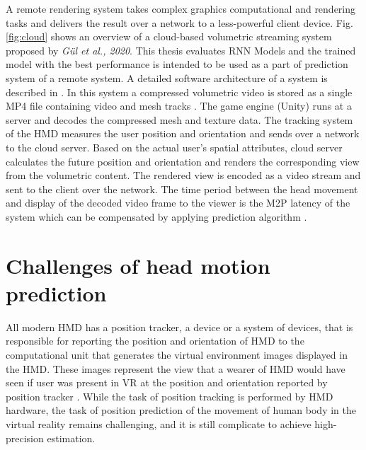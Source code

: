 A remote rendering system takes complex graphics computational and rendering tasks and delivers the result over a network to a less-powerful client device. Fig. \ref{fig:cloud}  shows an overview of a cloud-based volumetric streaming system proposed by \textit{Gül et al., 2020}. This thesis evaluates RNN Models and the trained model with the best performance is intended to be used as a part of prediction system of a remote system. A detailed software architecture of a system is described in \cite{serhan_cloud_streaming}. In this system a compressed volumetric video is stored as a single MP4 file containing video and mesh tracks \cite{serhan_kalman}. The game engine (Unity) runs at a server and decodes the compressed mesh and texture data. The tracking system of the HMD measures the user position and orientation and sends over a network to the cloud server. Based on the actual user's spatial attributes, cloud server calculates the future position and orientation and renders the corresponding view from the volumetric content. The rendered view is encoded as a video stream and sent to the client over the network. The time period between the head movement and display of the decoded video frame to the viewer is the M2P latency of the system which can be compensated by applying prediction algorithm \cite{serhan_kalman}.

\newpage
\section{Challenges of head motion prediction}
\label{sec:theorie:head_pred}
All modern HMD has a position tracker, a device or a system of devices, that is responsible for reporting  the position and orientation of HMD to the computational unit that generates the virtual environment images displayed in the HMD. These images represent the view that a wearer of HMD would have seen if user was present in VR at the position and orientation reported by position tracker \cite{hmd}. While the task of position tracking is performed by HMD hardware, the task of position prediction of the movement of human body in the virtual reality remains challenging, and it is still complicate to achieve high-precision estimation.

